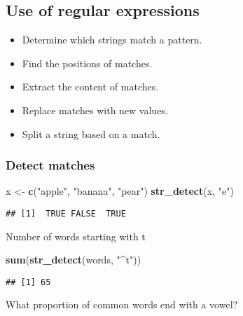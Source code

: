 \documentclass[
]{article}
\newenvironment{Shaded}{\begin{snugshade}}{\end{snugshade}}
\newcommand{\KeywordTok}[1]{\textcolor[rgb]{0.13,0.29,0.53}{\textbf{#1}}}
\newcommand{\NormalTok}[1]{#1}
\newcommand{\StringTok}[1]{\textcolor[rgb]{0.31,0.60,0.02}{#1}}
\providecommand{\tightlist}{%
  \setlength{\itemsep}{0pt}\setlength{\parskip}{0pt}}
\begin{document}
\hypertarget{use-of-regular-expressions}{%
\subsection{Use of regular
expressions}\label{use-of-regular-expressions}}

\begin{itemize}
\tightlist
\item
  Determine which strings match a pattern.
\item
  Find the positions of matches.
\item
  Extract the content of matches.
\item
  Replace matches with new values.
\item
  Split a string based on a match.
\end{itemize}

\hypertarget{detect-matches}{%
\subsubsection{Detect matches}\label{detect-matches}}

\begin{Shaded}
\begin{Highlighting}[]
\NormalTok{x \textless{}{-}}\StringTok{ }\KeywordTok{c}\NormalTok{(}\StringTok{"apple"}\NormalTok{, }\StringTok{"banana"}\NormalTok{, }\StringTok{"pear"}\NormalTok{)}
\KeywordTok{str\_detect}\NormalTok{(x, }\StringTok{"e"}\NormalTok{)}
\end{Highlighting}
\end{Shaded}

\begin{verbatim}
## [1]  TRUE FALSE  TRUE
\end{verbatim}

Number of words starting with t

\begin{Shaded}
\begin{Highlighting}[]
\KeywordTok{sum}\NormalTok{(}\KeywordTok{str\_detect}\NormalTok{(words, }\StringTok{"\^{}t"}\NormalTok{))}
\end{Highlighting}
\end{Shaded}

\begin{verbatim}
## [1] 65
\end{verbatim}

What proportion of common words end with a vowel?

\begin{Shaded}
\end{Shaded}
\end{document}
